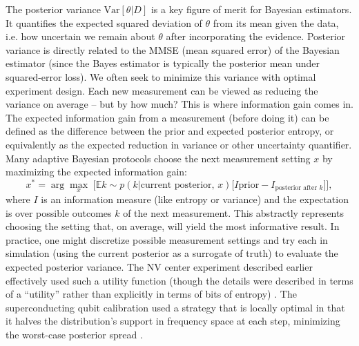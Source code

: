 The posterior variance $\mathrm{Var}[\theta | D]$ is a key figure of
merit for Bayesian estimators. It quantifies the expected squared
deviation of $\theta$ from its mean given the data, i.e. how uncertain
we remain about $\theta$ after incorporating the evidence. Posterior
variance is directly related to the MMSE (mean squared error) of the
Bayesian estimator (since the Bayes estimator is typically the
posterior mean under squared-error loss). We often seek to minimize
this variance with optimal experiment design. Each new measurement can
be viewed as reducing the variance on average – but by how much? This
is where information gain comes in. The expected information gain from
a measurement (before doing it) can be defined as the difference
between the prior and expected posterior entropy, or equivalently as
the expected reduction in variance or other uncertainty
quantifier. Many adaptive Bayesian protocols choose the next
measurement setting $x$ by maximizing the expected information gain:
\[
x^* = \arg\max_x \; \Big[ \mathbb{E}{k \sim p(k|\text{current posterior},\,x)} \big[ I{\text{prior}} - I_{\text{posterior after }k} \big] \Big],
\]
where $I$ is an information measure (like entropy or variance) and the
expectation is over possible outcomes $k$ of the next
measurement. This abstractly represents choosing the setting that, on
average, will yield the most informative result. In practice, one
might discretize possible measurement settings and try each in
simulation (using the current posterior as a surrogate of truth) to
evaluate the expected posterior variance. The NV center experiment
described earlier effectively used such a utility function (though the
details were described in terms of a “utility” rather than explicitly
in terms of bits of entropy) . The superconducting qubit calibration
used a strategy that is locally optimal in that it halves the
distribution’s support in frequency space at each step, minimizing the
worst-case posterior spread .



